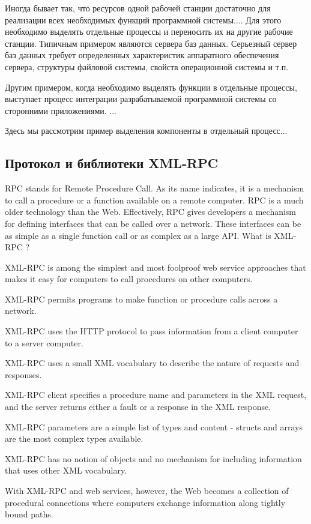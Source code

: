 \documentclass[a4paper,openany,twoside,draft]{book}
\begin{document}
Иногда бывает так, что ресурсов одной рабочей станции достаточно для реализации всех необходимых функций программной системы.... Для этого необходимо выделять отдельные процессы и переносить их на другие рабочие станции.  Типичным примером являются сервера баз данных.  Серьезный сервер баз данных требует определенных характеристик аппаратного обеспечения сервера, структуры файловой системы, свойств операционной системы и т.п.

Другим примером, когда необходимо выделять функции в отдельные процессы, выступает процесс интеграции разрабатываемой программной системы со сторонними приложениями.  ...

Здесь мы рассмотрим пример выделения компоненты в отдельный процесс...

\subsection{Протокол и библиотеки XML-RPC}
\label{sec:xmlrpc}

RPC stands for Remote Procedure Call. As its name indicates, it is a mechanism to call a procedure or a function available on a remote computer. RPC is a much older technology than the Web. Effectively, RPC gives developers a mechanism for defining interfaces that can be called over a network. These interfaces can be as simple as a single function call or as complex as a large API.
What is XML-RPC ?

XML-RPC is among the simplest and most foolproof web service approaches that makes it easy for computers to call procedures on other computers.

    XML-RPC permits programs to make function or procedure calls across a network.

    XML-RPC uses the HTTP protocol to pass information from a client computer to a server computer.

    XML-RPC uses a small XML vocabulary to describe the nature of requests and responses.

    XML-RPC client specifies a procedure name and parameters in the XML request, and the server returns either a fault or a response in the XML response.

    XML-RPC parameters are a simple list of types and content - structs and arrays are the most complex types available.

    XML-RPC has no notion of objects and no mechanism for including information that uses other XML vocabulary.

    With XML-RPC and web services, however, the Web becomes a collection of procedural connections where computers exchange information along tightly bound paths.
\end{document}
